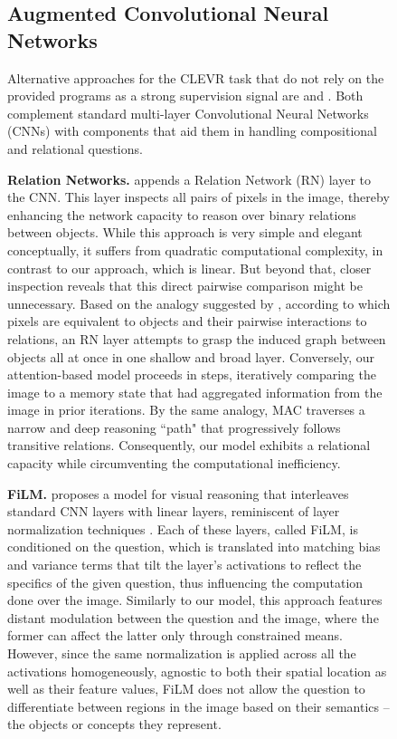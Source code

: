 \documentclass[fleqn]{article}
\begin{document}
\begin{figure}[t]
\begin{minipage}{0.55\textwidth}
\subsection{Augmented Convolutional Neural Networks}
Alternative approaches for the CLEVR task that do not rely on the provided programs as a strong supervision signal are \citet{rn} and \citet{film}. Both complement standard multi-layer Convolutional Neural Networks (CNNs) with components that aid them in handling compositional and relational questions.

\textbf{Relation Networks.} \citet{rn} appends a Relation Network (RN) layer to the CNN. This layer inspects all pairs of pixels in the image, thereby enhancing the network capacity to reason over binary relations between objects. While this approach is very simple and elegant conceptually, it suffers from quadratic computational complexity, in contrast to our approach, which is linear. But beyond that, closer inspection reveals that this direct pairwise comparison might be unnecessary. Based on the analogy suggested by \citet{rn}, according to which pixels are equivalent to objects and their pairwise interactions to relations, an RN layer attempts to grasp the induced graph between objects all at once in one shallow and broad layer. Conversely, our attention-based model proceeds in steps, iteratively comparing the image to a memory state that had aggregated information from the image in prior iterations. By the same analogy, MAC traverses a narrow and deep reasoning ``path" that progressively follows transitive relations. Consequently, our model exhibits a relational capacity while circumventing the computational inefficiency.

\textbf{FiLM.} \citet{film} proposes a model for visual reasoning that interleaves standard CNN layers with linear layers, reminiscent of layer normalization techniques \citep{ln,bn}. Each of these layers, called FiLM, is conditioned on the question, which is translated into matching bias and variance terms that tilt the layer's activations to reflect the specifics of the given question, thus influencing the computation done over the image. Similarly to our model, this approach features distant modulation between the question and the image, where the former can affect the latter only through constrained means. However, since the same normalization is applied across all the activations homogeneously, agnostic to both their spatial location as well as their feature values, FiLM does not allow the question to differentiate between regions in the image based on their semantics -- the objects or concepts they represent. 


\end{minipage}
\end{figure}
\end{document}
